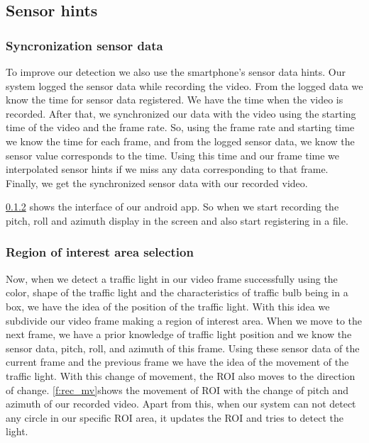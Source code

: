 \subsection{Sensor hints}
\subsubsection{Syncronization sensor data}
To improve our detection we also use the smartphone's sensor data hints.
Our system logged the sensor data while recording the video.
From the logged data we know the time for sensor data registered.
We have the time when the video is recorded.
After that, we synchronized our data with the video using the starting time of the video and the frame rate.
So, using the frame rate and starting time we know the time for each frame, and from the logged sensor data, we know the sensor value corresponds to the time.
Using this time and our frame time we interpolated sensor hints if we miss any data corresponding to that frame.
Finally, we get the synchronized sensor data with our recorded video.

\ref{} shows the interface of our android app.
So when we start recording the pitch, roll and azimuth display in the screen and also start registering in a file.

\subsubsection{Region of interest area selection}
Now, when we detect a traffic light in our video frame successfully using the color, shape of the traffic light and the characteristics of traffic bulb being in a box, we have the idea of the position of the traffic light.
With this idea we subdivide our video frame making a region of interest area.
When we move to the next frame, we have a prior knowledge of traffic light position and we know the sensor data, pitch, roll, and azimuth of this frame.
Using these sensor data of the current frame and the previous frame we have the idea of the movement of the traffic light.
With this change of movement, the ROI also moves to the direction of change.
\ref{f:rec_mv}shows the movement of ROI with the change of pitch and azimuth of our recorded video.
Apart from this, when our system can not detect any circle in our specific ROI area, it updates the ROI and tries to detect the light.

